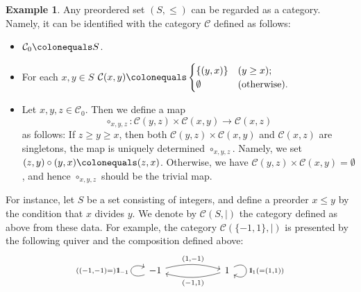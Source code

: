 \documentclass{surv-l}
\numberwithin{equation}{chapter}
\numberwithin{figure}{chapter}
\theoremstyle{plain}
\theoremstyle{definition}
\newtheorem{exm}[thm]{Example}
\theoremstyle{remark}
\newcommand{\id}{1\kern-.25em{\text{{\rm l}}}}
\newcommand{\Ar}[3]{\ar[from={#1}, to={#2}, #3]}
\begin{document}
\begin{exm}\label{exm:poset-cat}
Any preordered set $(S, \le)$ can be regarded as a category.
Namely, it can be identified with the category ${\mathcal{C}}$ defined  as follows:
\begin{itemize}
\item
${\mathcal{C}}_0\colonequals  S$.
\item
For each $x, y \in S$
${\mathcal{C}}(x, y)\colonequals  \begin{cases}
\{(y, x)\} &(y \ge x);\\
\emptyset &(\text{otherwise}).
\end{cases}
$
\item
Let $x,y,z \in {\mathcal{C}}_0$.  Then we define a map
\[
\circ_{x,y,z}\colon {\mathcal{C}}(y,z) \times {\mathcal{C}}(x,y) \to {\mathcal{C}}(x, z)
\]
as follows:
If $z \ge y \ge x$, then both ${\mathcal{C}}(y,z) \times {\mathcal{C}}(x,y)$ and ${\mathcal{C}}(x, z)$ are singletons,
the map is uniquely determined $\circ_{x,y,z}$.
Namely, we set $(z, y) \circ (y, x)\colonequals  (z, x)$.
Otherwise, we have
${\mathcal{C}}(y,z) \times {\mathcal{C}}(x,y) = \emptyset$, and hence $\circ_{x,y,z}$ should be the trivial map.
\end{itemize}
For instance, let $S$ be a set consisting of integers,
and define a preorder $x \le y$ by the condition that $x$ divides $y$.
We denote by ${\mathcal{C}}(S, |)$ the category defined as above from these data.
For example, the category
${\mathcal{C}}(\{-1, 1\}, |)$ is presented by the following quiver and the composition
defined above:
\[
\begin{tikzcd}[column sep=2cm]
-1 & 1
\Ar{1-1}{1-2}{"{(1, -1)}", bend left=15}
\Ar{1-2}{1-1}{"{(-1, 1)}", bend left=15}
\Ar{1-1}{1-1}{loop, out=200, in=160, distance=20, "{((-1,-1) =)\id_{-1}}"}
\Ar{1-2}{1-2}{loop, out=30, in=-30, distance=20, "{\id_{1}(= (1,1))}"}
\end{tikzcd}
\]
\end{exm}
\end{document}
